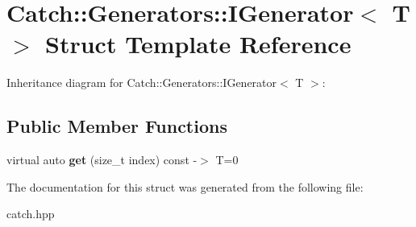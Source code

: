 \hypertarget{structCatch_1_1Generators_1_1IGenerator}{}\section{Catch\+:\+:Generators\+:\+:I\+Generator$<$ T $>$ Struct Template Reference}
\label{structCatch_1_1Generators_1_1IGenerator}


Inheritance diagram for Catch\+:\+:Generators\+:\+:I\+Generator$<$ T $>$\+:
\subsection*{Public Member Functions}
\begin{DoxyCompactItemize}
\item 
\mbox{\label{structCatch_1_1Generators_1_1IGenerator_a737a89eb0bff02e580e36c59fb0d1171}} 
virtual auto {\bfseries get} (size\+\_\+t index) const -\/$>$ T=0
\end{DoxyCompactItemize}


The documentation for this struct was generated from the following file\+:\begin{DoxyCompactItemize}
\item 
catch.\+hpp\end{DoxyCompactItemize}

